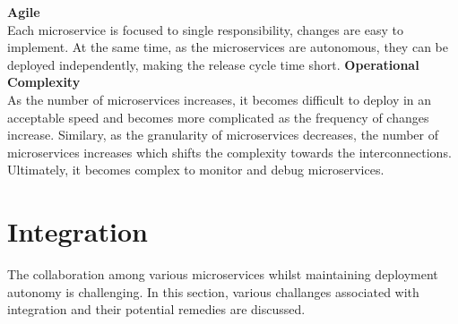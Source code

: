   \begin{multicols}{2}
  \textbf{Agile}\\ Each microservice is focused to single responsibility, changes are easy to implement. At the same time, as the microservices are autonomous, they can be deployed independently, making the release cycle time short.
  \vfill
  \columnbreak
  \textbf{Operational Complexity} \\ As the number of microservices increases, it becomes difficult to deploy in an acceptable speed and becomes more complicated as the frequency of changes increase. Similary, as the granularity of microservices decreases, the number of microservices increases which shifts the complexity towards the interconnections. Ultimately, it becomes complex to monitor and debug microservices.
   \end{multicols}

\section{Integration}\label{section:challanges_of_microservices_architecture/integration}
The collaboration among various microservices whilst maintaining deployment autonomy is challenging. In this section, various challanges associated with integration and their potential remedies are discussed.

